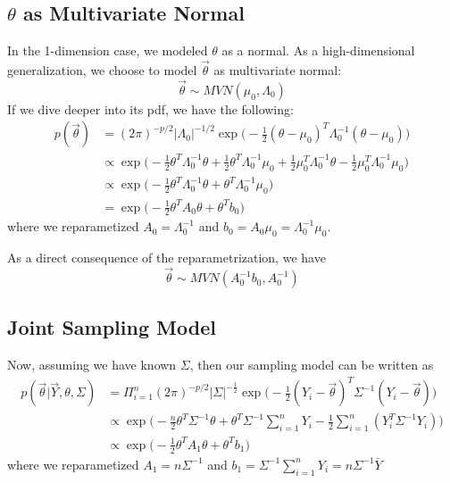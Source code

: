 \subsection{$\theta$ as Multivariate Normal}
In the 1-dimension case, we modeled $\theta$ as a normal. As a high-dimensional generalization, we choose to model $\vec{\theta}$ as multivariate normal:
\begin{equation*}
    \vec{\theta} \sim MVN(\mu_0, \Lambda_0)
\end{equation*}
If we dive deeper into its pdf, we have the following:
\begin{align*}
    p(\vec{\theta}) &= (2\pi)^{-p/2}|\Lambda_0|^{-1/2} \exp \big( -\frac{1}{2}(\theta - \mu_0)^T \Lambda_0^{-1}(\theta - \mu_0) \big) \\
    &\propto \exp \big( -\frac{1}{2}\theta^T\Lambda_0^{-1}\theta + \frac{1}{2}\theta^T\Lambda_0^{-1}\mu_0 + \frac{1}{2}\mu_0^T\Lambda_0^{-1}\theta - \frac{1}{2}\mu_0^T\Lambda_0^{-1}\mu_0 \big) \\
    &\propto \exp \big( -\frac{1}{2}\theta^T\Lambda_0^{-1}\theta + \theta^T\Lambda_0^{-1}\mu_0 \big) \\ 
    &= \exp \big( -\frac{1}{2}\theta^TA_0\theta + \theta^T b_0 \big)
\end{align*}
where we reparametized $A_0 = \Lambda_0^{-1}$ and $b_0 = A_0\mu_0 = \Lambda_0^{-1}\mu_0$.

As a direct consequence of the reparametrization, we have 
\begin{equation*}
    \vec{\theta} \sim MVN(A_0^{-1}b_0, A_0^{-1})
\end{equation*}

\subsection*{Joint Sampling Model}
Now, assuming we have known $\Sigma$, then our sampling model can be written as 
\begin{align*}
    p(\vec{\theta} | \vec{Y}, \theta, \Sigma) &= \Pi_{i=1}^n (2\pi)^{-p/2} |\Sigma|^{-\frac{1}{2}} \exp \big( -\frac{1}{2}(Y_i - \vec{\theta})^T \Sigma^{-1}(Y_i - \vec{\theta}) \big) \\
    &\propto \exp \big( -\frac{n}{2}\theta^T\Sigma^{-1}\theta + \theta^T\Sigma^{-1}\sum_{i=1}^n Y_i - \frac{1}{2}\sum_{i=1}^n(Y_i^T\Sigma^{-1}Y_i) \big) \\
    &\propto \exp \big( -\frac{1}{2}\theta^TA_1\theta + \theta^Tb_1 \big)
\end{align*}
where we reparametized $A_1 = n\Sigma^{-1}$ and $b_1 = \Sigma^{-1}\sum_{i=1}^nY_i = n\Sigma^{-1}\bar{Y}$

